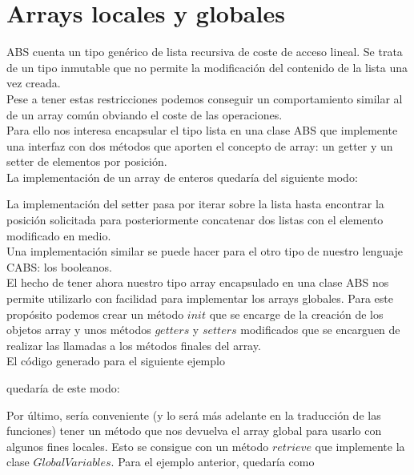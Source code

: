 \section{Arrays locales y globales}

ABS cuenta un tipo genérico de lista recursiva de coste de acceso lineal. Se trata de un tipo inmutable que no permite la modificación del contenido de la lista una vez creada.\\

Pese a tener estas restricciones podemos conseguir un comportamiento similar al de un array común obviando el coste de las operaciones.\\

Para ello nos interesa encapsular el tipo lista en una clase ABS que implemente una interfaz con dos métodos que aporten el concepto de array:
un getter y un setter de elementos por posición.\\

La implementación de un array de enteros quedaría del siguiente modo:



La implementación del setter pasa por iterar sobre la lista hasta encontrar la posición solicitada para posteriormente concatenar dos listas con el elemento modificado en medio.\\

Una implementación similar se puede hacer para el otro tipo de nuestro lenguaje CABS: los booleanos.\\

El hecho de tener ahora nuestro tipo array encapsulado en una clase ABS nos permite utilizarlo con facilidad para implementar los arrays globales. Para este propósito podemos crear un método $init$ que se encarge de la creación de los objetos array y unos métodos $getters$ y $setters$ modificados que se encarguen de realizar las llamadas a los métodos finales del array.\\

El código generado para el siguiente ejemplo



quedaría de este modo:



Por último, sería conveniente (y lo será más adelante en la traducción de las funciones) tener un método que nos devuelva el array global para usarlo con algunos fines locales. Esto se consigue con un método $retrieve$ que implemente la clase $GlobalVariables$. Para el ejemplo anterior, quedaría como

